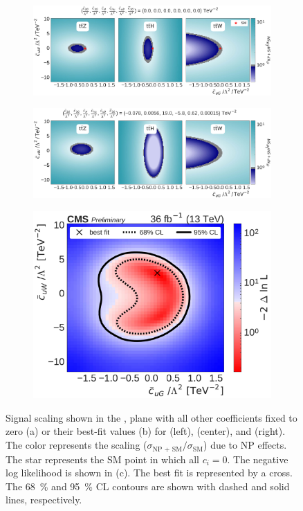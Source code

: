 \begin{figure}
  \vspace{-1cm}
  \begin{subfigure}{\linewidth}
    \centering
    \includegraphics[width=\linewidth]{figures/thirteen-TeV/scaling-frozen/cuG_cuW}
    \caption{}
  \end{subfigure}
  \begin{subfigure}{\linewidth}
    \centering
    \includegraphics[width=\linewidth]{figures/thirteen-TeV/scaling/cuG_cuW}
    \caption{}
  \end{subfigure}
  \begin{subfigure}{\linewidth}
    \centering
    \includegraphics[width=0.6\linewidth]{figures/thirteen-TeV/nll/cuG_cuW}
    \caption{}
  \end{subfigure}
  \vspace{-1cm}
  \setlength{\capwidth}{15cm}
  \caption[Signal scaling and profile likelihood scan in the \cuG, \cuW plane]{Signal scaling shown
  in the \cuG, \cuW plane with all other coefficients fixed to zero (a) or their best-fit values (b)
  for \ttZ (left), \ttH (center), and \ttW (right). The color represents the scaling ($\sigma_\text{NP
  + SM} / \sigma_\text{SM}$) due to NP effects. The star represents the SM point in which all $c_i=0$.
  The negative log likelihood is shown in (c). The best fit is represented by a cross. The
  \SI{68}{\percent} and \SI{95}{\percent} CL contours are shown with dashed and solid lines,
  respectively.}
\end{figure}

